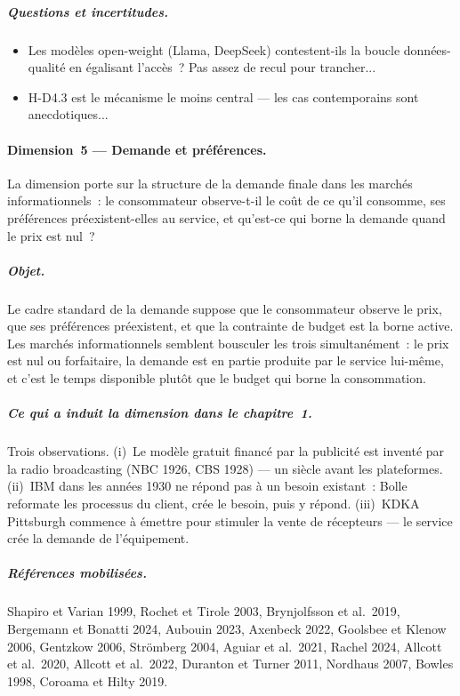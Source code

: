 \subparagraph{Questions et incertitudes.}
\begin{itemize}
\item Les mod\`eles open-weight (Llama, DeepSeek) contestent-ils la boucle donn\'ees-qualit\'e en \'egalisant l'acc\`es~? Pas assez de recul pour trancher...
\item H-D4.3 est le m\'ecanisme le moins central --- les cas contemporains sont anecdotiques...
\end{itemize}


\paragraph{Dimension~5 --- Demande et pr\'ef\'erences.}
La dimension porte sur la structure de la demande finale dans les march\'es informationnels~: le consommateur observe-t-il le co\^ut de ce qu'il consomme, ses pr\'ef\'erences pr\'eexistent-elles au service, et qu'est-ce qui borne la demande quand le prix est nul~?

\subparagraph{Objet.}
Le cadre standard de la demande suppose que le consommateur observe le prix, que ses pr\'ef\'erences pr\'eexistent, et que la contrainte de budget est la borne active. Les march\'es informationnels semblent bousculer les trois simultan\'ement~: le prix est nul ou forfaitaire, la demande est en partie produite par le service lui-m\^eme, et c'est le temps disponible plut\^ot que le budget qui borne la consommation. 

\subparagraph{Ce qui a induit la dimension dans le chapitre~1.}
Trois observations. (i)~Le mod\`ele gratuit financ\'e par la publicit\'e est invent\'e par la radio broadcasting (NBC 1926, CBS 1928) --- un si\`ecle avant les plateformes. (ii)~IBM dans les ann\'ees 1930 ne r\'epond pas \`a un besoin existant~: Bolle reformate les processus du client, cr\'ee le besoin, puis y r\'epond. (iii)~KDKA Pittsburgh commence \`a \'emettre pour stimuler la vente de r\'ecepteurs --- le service cr\'ee la demande de l'\'equipement.

\subparagraph{R\'ef\'erences mobilis\'ees.}
Shapiro et Varian 1999, Rochet et Tirole 2003, Brynjolfsson et al.\ 2019, Bergemann et Bonatti 2024, Aubouin 2023, Axenbeck 2022, Goolsbee et Klenow 2006, Gentzkow 2006, Str\"omberg 2004, Aguiar et al.\ 2021, Rachel 2024, Allcott et al.\ 2020, Allcott et al.\ 2022, Duranton et Turner 2011, Nordhaus 2007, Bowles 1998, Coroama et Hilty 2019.

